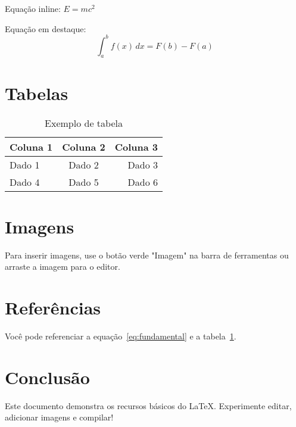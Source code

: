 \documentclass[12pt,a4paper]{article}
\begin{document}
Equação inline: $E = mc^2$

Equação em destaque:
\begin{equation}
  \int_{a}^{b} f(x) \, dx = F(b) - F(a)
  \label{eq:fundamental}
\end{equation}

\section{Tabelas}

\begin{table}[h]
  \centering
  \begin{tabular}{|l|c|r|}
    \hline
    \textbf{Coluna 1} & \textbf{Coluna 2} & \textbf{Coluna 3} \\
    \hline
    Dado 1 & Dado 2 & Dado 3 \\
    Dado 4 & Dado 5 & Dado 6 \\
    \hline
  \end{tabular}
  \caption{Exemplo de tabela}
  \label{tab:exemplo}
\end{table}

\section{Imagens}

Para inserir imagens, use o botão verde "Imagem" na barra de ferramentas ou arraste a imagem para o editor.


\section{Referências}

Você pode referenciar a equação~\ref{eq:fundamental} e a tabela~\ref{tab:exemplo}.

\section{Conclusão}

Este documento demonstra os recursos básicos do LaTeX. Experimente editar, adicionar imagens e compilar!
\end{document}
